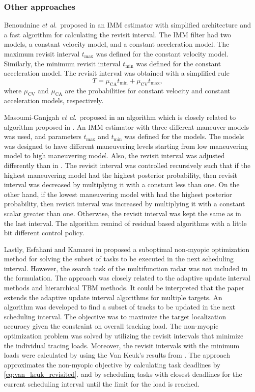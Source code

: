 \documentclass[english, 12pt, a4paper, elec, utf8, a-1b, online]{aaltothesis}
\newcommand{\etal}{\textit{et al}.~}
\newcommand{\tmax}{t_\text{max}}
\newcommand{\tmin}{t_\text{min}}
\newcommand{\muca}{\mu_{\text{CA}}}
\newcommand{\mucv}{\mu_{\text{CV}}}
\begin{document}
\subsubsection{Other approaches}

Benoudnine \etal proposed in \cite{Benoudnine2006} an IMM estimator with simplified architecture and a fast algorithm for calculating the revisit interval.
The IMM filter had two models, a constant velocity model, and a constant acceleration model.
The maximum revisit interval $\tmax$ was defined for the constant velocity model.
Similarly, the minimum revisit interval $\tmin$ was defined for the constant acceleration model.
The revisit interval was obtained with a simplified rule
\begin{equation}
    T = \muca \tmin + \mucv \tmax,
\end{equation}
where $\mucv$ and $\muca$ are the probabilities for constant velocity and constant acceleration models, respectively.

Masoumi-Ganjgah \etal proposed in \cite{Masoumi-Ganjgah2017} an algorithm which is closely related to algorithm proposed in \cite{Benoudnine2006}.
An IMM estimator with three different maneuver models was used, and parameters $\tmax$ and $\tmin$ was defined for the models.
The models was designed to have different maneuvering levels starting from low maneuvering model to high maneuvering model.
Also, the revisit interval was adjusted differently than in \cite{Benoudnine2006}.
The revisit interval was controlled recursively such that if the highest maneuvering model had the highest posterior probability, then 
revisit interval was decreased by multiplying it with a constant less than one.
On the other hand, if the lowest maneuvering model with had the highest posterior probability, then
revisit interval was increased by multiplying it with a constant scalar greater than one.
Otherwise, the revisit interval was kept the same as in the last interval.
The algorithm remind of residual based algorithms with a little bit different control policy.

Lastly, Esfahani and Kamarei in \cite{Esfahani2012} proposed a suboptimal non-myopic optimization method for solving the subset of tasks to be executed in the next scheduling interval.
However, the search task of the multifunction radar was not included in the formulation.
The approach was closely related to the adaptive update interval methods and hierarchical TBM methods.
It could be interpreted that the paper extends the adaptive update interval algorithms for multiple targets.
An algorithm was developed to find a subset of tracks to be updated in the next scheduling interval.
The objective was to maximize the target localization accuracy given the constraint on overall tracking load.
The non-myopic optimization problem was solved by utilizing the revisit intervals that minimize the individual tracing loads.
Moreover, the revisit intervals with the minimum loads were calculated by using the Van Keuk's results from \cite{vanKeuk1993}.
The approach approximates the non-myopic objective by calculating task deadlines by \eqref{eq:van_keuk_revisited}, and by scheduling tasks with closest deadlines for the current scheduling interval until the limit for the load is reached.
\end{document}
